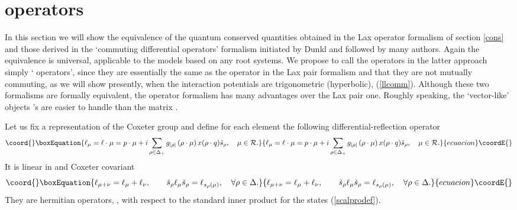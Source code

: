 \documentclass[a4paper,12pt]{article}
\begin{document}
\section{\myHighlight{\(\ell\)}\coordHE{} operators}
\label{lops}
\setcounter{equation}{0}
In this section we will show the equivalence of the
quantum conserved quantities obtained in the Lax operator formalism
of section \ref{cons} and those derived in the `commuting differential
operators' formalism initiated by Dunkl \cite{Dunk} and followed by many
authors.
Again the equivalence is universal, applicable to the models based on
any root systems.
We propose to call the operators in the latter approach simply
`\myHighlight{\(\ell\)}\coordHE{} operators', since they are essentially the same as the
\coordHE{} operator in the Lax pair formalism and that they are not mutually
commuting, as we will show presently, when the interaction potentials are
trigonometric (hyperbolic), (\ref{llcomm}).
Although these two formalisms are formally equivalent, the \myHighlight{\(\ell\)}\coordHE{}
operator formalism has many advantages over the Lax pair
one. Roughly speaking, the `vector-like' objects \myHighlight{\(\ell_\mu\)}\coordHE{}'s are easier
to handle than the matrix \coordHE{}.


Let us fix a representation \coordHE{} of the Coxeter group
\coordHE{}
and define for each element \coordHE{} the following
differential-reflection operator
\begin{equation}\coord{}\boxEquation{
   \ell_{\mu}=\ell\cdot\mu=p\cdot\mu+i
   \sum_{\rho\in\Delta_{+}}g_{|\rho|}
   \,(\rho\cdot\mu)\,x(\rho\cdot q)\check{s}_{\rho},\quad \mu\in{\cal R}.
   \label{ldefs}
}{
   \ell_{\mu}=\ell\cdot\mu=p\cdot\mu+i
   \sum_{\rho\in\Delta_{+}}g_{|\rho|}
   \,(\rho\cdot\mu)\,x(\rho\cdot q)\check{s}_{\rho},\quad \mu\in{\cal R}.
   }{ecuacion}\coordE{}\end{equation}
It is linear in \myHighlight{\(\mu\)}\coordHE{} and Coxeter covariant
\begin{equation}\coord{}\boxEquation{
   \ell_{\mu+\nu}=\ell_{\mu}+\ell_{\nu},\qquad
   \check{s}_{\rho}\ell_{\mu}\check{s}_{\rho}=\ell_{s_{\rho}(\mu)},\quad
   \forall \rho\in\Delta.
}{
   \ell_{\mu+\nu}=\ell_{\mu}+\ell_{\nu},\qquad
   \check{s}_{\rho}\ell_{\mu}\check{s}_{\rho}=\ell_{s_{\rho}(\mu)},\quad
   \forall \rho\in\Delta.
}{ecuacion}\coordE{}\end{equation}
They are hermitian operators, \myHighlight{\(\ell_{\mu}^\dagger=\ell_{\mu}\)}\coordHE{},
with respect to
the standard inner product
for  the states (\ref{scalprodef}).
\end{document}
